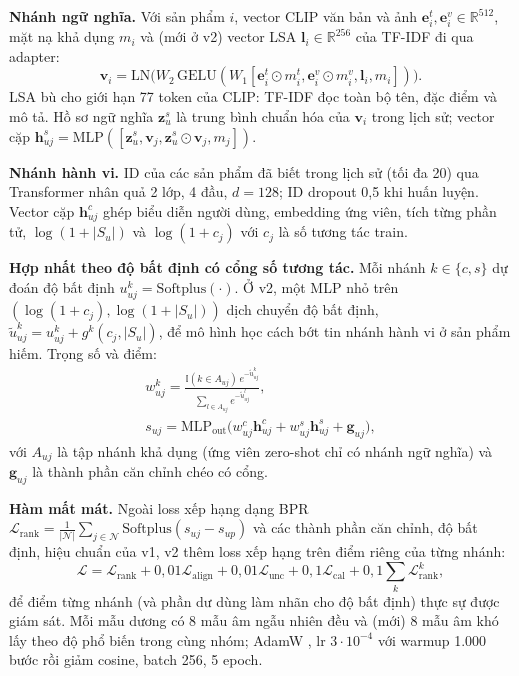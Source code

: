 \documentclass[conference,a4paper]{IEEEtran}
\begin{document}
\textbf{Nhánh ngữ nghĩa.} Với sản phẩm $i$, vector CLIP văn bản và ảnh $\mathbf{e}_i^{t},\mathbf{e}_i^{v}\in\mathbb{R}^{512}$, mặt nạ khả dụng $m_i$ và (mới ở v2) vector LSA $\mathbf{l}_i\in\mathbb{R}^{256}$ của TF-IDF đi qua adapter:
\begin{equation}
\mathbf{v}_i=\mathrm{LN}\big(W_2\,\mathrm{GELU}(W_1[\mathbf{e}_i^{t}\odot m_i^{t},\mathbf{e}_i^{v}\odot m_i^{v},\mathbf{l}_i,m_i])\big).
\end{equation}
LSA bù cho giới hạn 77 token của CLIP: TF-IDF đọc toàn bộ tên, đặc điểm và mô tả. Hồ sơ ngữ nghĩa $\mathbf{z}_u^{s}$ là trung bình chuẩn hóa của $\mathbf{v}_i$ trong lịch sử; vector cặp $\mathbf{h}^{s}_{uj}=\mathrm{MLP}([\mathbf{z}_u^{s},\mathbf{v}_j,\mathbf{z}_u^{s}\odot\mathbf{v}_j,m_j])$.

\textbf{Nhánh hành vi.} ID của các sản phẩm đã biết trong lịch sử (tối đa 20) qua Transformer nhân quả 2 lớp, 4 đầu, $d=128$; ID dropout 0,5 khi huấn luyện. Vector cặp $\mathbf{h}^{c}_{uj}$ ghép biểu diễn người dùng, embedding ứng viên, tích từng phần tử, $\log(1{+}|S_u|)$ và $\log(1{+}c_j)$ với $c_j$ là số tương tác train.

\textbf{Hợp nhất theo độ bất định có cổng số tương tác.} Mỗi nhánh $k\in\{c,s\}$ dự đoán độ bất định $u^{k}_{uj}=\mathrm{Softplus}(\cdot)$. Ở v2, một MLP nhỏ trên $(\log(1{+}c_j),\log(1{+}|S_u|))$ dịch chuyển độ bất định, $\tilde u^{k}_{uj}=u^{k}_{uj}+g^{k}(c_j,|S_u|)$, để mô hình học cách bớt tin nhánh hành vi ở sản phẩm hiếm. Trọng số và điểm:
\begin{gather}
w^{k}_{uj}=\frac{\mathbb{I}(k\in A_{uj})\,e^{-\tilde u^{k}_{uj}}}{\sum_{l\in A_{uj}}e^{-\tilde u^{l}_{uj}}},\\
s_{uj}=\mathrm{MLP}_{\text{out}}\big(w^{c}_{uj}\mathbf{h}^{c}_{uj}+w^{s}_{uj}\mathbf{h}^{s}_{uj}+\mathbf{g}_{uj}\big),
\end{gather}
với $A_{uj}$ là tập nhánh khả dụng (ứng viên zero-shot chỉ có nhánh ngữ nghĩa) và $\mathbf{g}_{uj}$ là thành phần căn chỉnh chéo có cổng.

\textbf{Hàm mất mát.} Ngoài loss xếp hạng dạng BPR \cite{rendle2009} $\mathcal{L}_{\text{rank}}=\frac{1}{|\mathcal{N}|}\sum_{j\in\mathcal{N}}\mathrm{Softplus}(s_{uj}-s_{up})$ và các thành phần căn chỉnh, độ bất định, hiệu chuẩn của v1, v2 thêm loss xếp hạng trên điểm riêng của từng nhánh:
\begin{equation}
\mathcal{L}=\mathcal{L}_{\text{rank}}+0{,}01\mathcal{L}_{\text{align}}+0{,}01\mathcal{L}_{\text{unc}}+0{,}1\mathcal{L}_{\text{cal}}+0{,}1\!\sum_{k}\mathcal{L}^{k}_{\text{rank}},
\end{equation}
để điểm từng nhánh (và phần dư dùng làm nhãn cho độ bất định) thực sự được giám sát. Mỗi mẫu dương có 8 mẫu âm ngẫu nhiên đều và (mới) 8 mẫu âm khó lấy theo độ phổ biến trong cùng nhóm; AdamW \cite{loshchilov2019}, lr $3\cdot10^{-4}$ với warmup 1.000 bước rồi giảm cosine, batch 256, 5 epoch.
\end{document}
